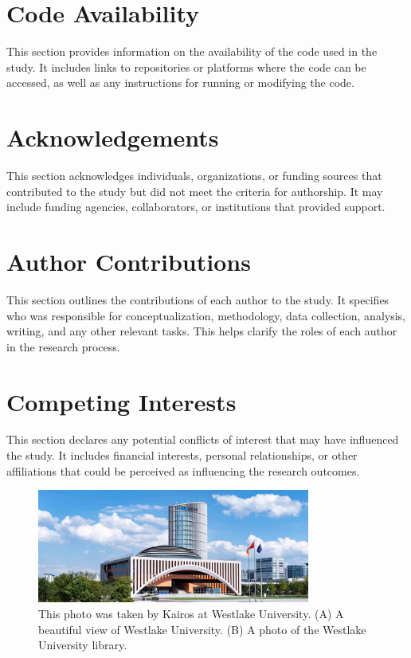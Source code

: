 \section{Code Availability}
This section provides information on the availability of the code used in the study. It includes links to repositories or platforms where the code can be accessed, as well as any instructions for running or modifying the code.
\section{Acknowledgements}
This section acknowledges individuals, organizations, or funding sources that contributed to the study but did not meet the criteria for authorship. It may include funding agencies, collaborators, or institutions that provided support.
\section{Author Contributions}
This section outlines the contributions of each author to the study. It specifies who was responsible for conceptualization, methodology, data collection, analysis, writing, and any other relevant tasks. This helps clarify the roles of each author in the research process.
\section{Competing Interests}
This section declares any potential conflicts of interest that may have influenced the study. It includes financial interests, personal relationships, or other affiliations that could be perceived as influencing the research outcomes.
\printbibliography[title={References}]
\newpage
\begin{figure}[htbp]
    \begin{center}
        \includegraphics[width=0.8\textwidth]{./figures/westlake.jpg}
    \end{center}
            \caption{This photo was taken by Kairos at Westlake University. (A) A beautiful view of Westlake University. (B) A photo of the Westlake University library.}
    \label{fig1}
\end{figure}

